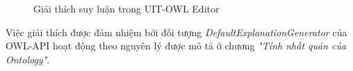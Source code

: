 \begin{figure}[H]
	\centering
	\caption{Giải thích suy luận trong UIT-OWL Editor\label{overflow}}
\end{figure}
Việc giải thích được đảm nhiệm bởi đối tượng \textit{DefaultExplanationGenerator} của OWL-API hoạt động theo nguyên lý được mô tả ở chương \textit{"Tính nhất quán của Ontology"}.

